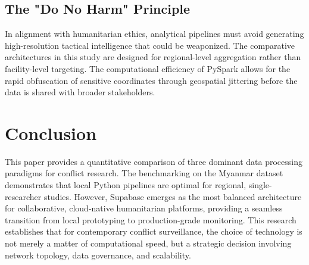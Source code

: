 \documentclass[conference]{IEEEtran}
\begin{document}
\subsection{The "Do No Harm" Principle}
In alignment with humanitarian ethics, analytical pipelines must avoid generating high-resolution tactical intelligence that could be weaponized. The comparative architectures in this study are designed for regional-level aggregation rather than facility-level targeting. The computational efficiency of PySpark allows for the rapid obfuscation of sensitive coordinates through geospatial jittering before the data is shared with broader stakeholders.

\section{Conclusion}

This paper provides a quantitative comparison of three dominant data processing paradigms for conflict research. The benchmarking on the Myanmar dataset demonstrates that local Python pipelines are optimal for regional, single-researcher studies. However, Supabase emerges as the most balanced architecture for collaborative, cloud-native humanitarian platforms, providing a seamless transition from local prototyping to production-grade monitoring. This research establishes that for contemporary conflict surveillance, the choice of technology is not merely a matter of computational speed, but a strategic decision involving network topology, data governance, and scalability.



\end{document}
